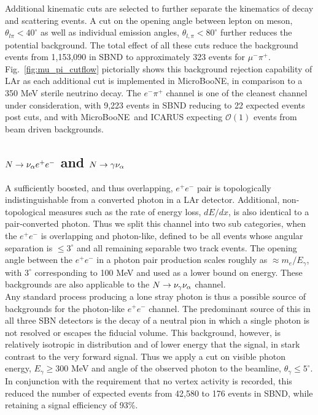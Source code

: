\documentclass[11pt, a4paper]{article}
\newcommand{\reffig}[1]{Fig.~\ref{#1}}
\def\muboone{MicroBooNE}
\def\ster{\ensuremath N}
\begin{document}
Additional kinematic cuts are selected to further separate the kinematics of
decay and scattering events. A cut on the opening angle between lepton on
meson, $\theta_{l \pi} < 40^\circ$ as well as individual emission angles,
$\theta_{l,\pi} < 80^\circ$ further reduces the potential background. The total
effect of all these cuts reduce the background events from 1,153,090 in SBND to
approximately 323 events for $\mu^- \pi^+$.  \reffig{fig:mu_pi_cutflow}
pictorially shows this background rejection capability of LAr as each
additional cut is implemented in \muboone, in comparison to a 350 MeV sterile neutrino
decay. The $e^- \pi^+$ channel is one of the cleanest channel under
consideration, with 9,223 events in SBND reducing to 22 expected events post
cuts, and with \muboone\ and ICARUS expecting $\mathcal{O}(1)$ events from beam
driven backgrounds.


\subsection{$\ster \rightarrow \nu_\alpha e^+ e^-$ and $\ster \rightarrow \gamma \nu_\alpha$ }

A sufficiently boosted, and thus overlapping, $e^+e^-$ pair is topologically
indistinguishable from a converted photon in a LAr detector. Additional,
non-topological measures such as the rate of energy loss, $dE/dx$, is also
identical to a pair-converted photon. Thus we split this channel into two sub
categories, when the $e^+e^-$ is overlapping and photon-like, defined to be all
events whose angular separation is $\leq 3^\circ$\cite{Spitz:2011wba} and all
remaining separable two track events. The opening angle between the $e^+e^-$ in
a photon pair production scales roughly as $\approx m_e/E_\gamma$, with
$3^\circ$ corresponding to 100 MeV and used as a lower bound on energy. These
backgrounds are also applicable to the $\ster \rightarrow \nu_\gamma
\nu_\alpha$ channel.\\ 

Any standard process producing a lone stray photon is thus a possible source of
backgrounds for the photon-like $e^+e^-$ channel. The predominant source of
this in all three SBN detectors is the decay of a neutral pion in which a
single photon is not resolved or escapes the fiducial volume. This background,
however, is relatively isotropic in distribution and of lower energy that the
signal, in stark contrast to the very forward signal. Thus we apply a cut on
visible photon energy, $E_\gamma \geq 300 $ MeV and angle of the observed
photon to the beamline, $\theta_\gamma \leq 5^\circ$. In conjunction with the
requirement that no vertex activity is recorded, this reduced the number of
expected events from 42,580 to 176 events in SBND, while retaining a signal
efficiency of 93\%.
\end{document}
